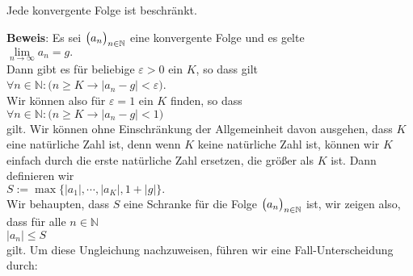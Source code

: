 \begin{Satz}
Jede konvergente Folge  ist beschr\"ankt.
\end{Satz}
\textbf{Beweis}: Es sei  $\bigl(a_n\bigr)_{n\in\mathbb{N}}$ eine konvergente Folge und es gelte
\\[0.2cm]
\hspace*{1.3cm}
$ \lim\limits_{n\rightarrow\infty} a_n = g. $
\\[0.2cm]
Dann gibt es f\"ur beliebige $\varepsilon > 0$ ein $K$, so dass gilt
\\[0.2cm]
\hspace*{1.3cm}
$\forall n \in \mathbb{N}: \bigl(n \geq K \rightarrow \bigl| a_n - g \bigr| < \varepsilon\bigr)$.
\\[0.2cm]
Wir k\"onnen also f\"ur $\varepsilon = 1$ ein $K$ finden, so dass
\\[0.2cm]
\hspace*{1.3cm}
$\forall n \in \mathbb{N}:\bigl(n \geq K \rightarrow \bigl| a_n - g \bigr| < 1\bigr)$
\\[0.2cm]
gilt.  Wir k\"onnen ohne Einschr\"ankung der Allgemeinheit davon ausgehen, dass
$K$ eine nat\"urliche Zahl ist, denn wenn $K$ keine nat\"urliche Zahl ist, k\"onnen wir $K$
einfach durch die erste nat\"urliche Zahl ersetzen, die gr\"o\ss{}er als $K$ ist.
Dann definieren wir 
\\[0.2cm]
\hspace*{1.3cm}
$ S := \max\bigl\{ |a_1|, \cdots, |a_K|, 1 + |g| \bigr\}.  $
\\[0.2cm]
Wir behaupten, dass $S$ eine Schranke f\"ur die Folge $\bigl(a_n\bigr)_{n\in\mathbb{N}}$ ist, wir zeigen also,
dass f\"ur alle $n \in \mathbb{N}$ 
\\[0.2cm]
\hspace*{1.3cm}
$ |a_n| \leq S $
\\[0.2cm] 
gilt.
Um diese Ungleichung nachzuweisen, f\"uhren wir eine Fall-Unterscheidung durch:
